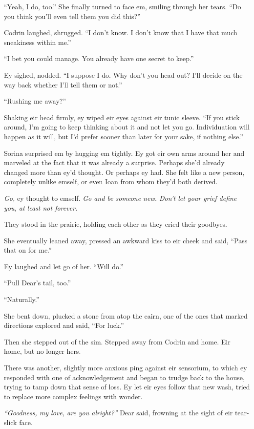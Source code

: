 ``Yeah, I do, too.'' She finally turned to face em, smiling through her tears. ``Do you think you'll even tell them you did this?''

Codrin laughed, shrugged. ``I don't know. I don't know that I have that much sneakiness within me.''

``I bet you could manage. You already have one secret to keep.''

Ey sighed, nodded. ``I suppose I do. Why don't you head out? I'll decide on the way back whether I'll tell them or not.''

``Rushing me away?''

Shaking eir head firmly, ey wiped eir eyes against eir tunic sleeve. ``If you stick around, I'm going to keep thinking about it and not let you go. Individuation will happen as it will, but I'd prefer sooner than later for your sake, if nothing else.''

Sorina surprised em by hugging em tightly. Ey got eir own arms around her and marveled at the fact that it was already a surprise. Perhaps she'd already changed more than ey'd thought. Or perhaps ey had. She felt like a new person, completely unlike emself, or even Ioan from whom they'd both derived.

\emph{Go,} ey thought to emself. \emph{Go and be someone new. Don't let your grief define you, at least not forever.}

They stood in the prairie, holding each other as they cried their goodbyes.

She eventually leaned away, pressed an awkward kiss to eir cheek and said, ``Pass that on for me.''

Ey laughed and let go of her. ``Will do.''

``Pull Dear's tail, too.''

``Naturally.''

She bent down, plucked a stone from atop the cairn, one of the ones that marked directions explored and said, ``For luck.''

Then she stepped out of the sim. Stepped away from Codrin and home. Eir home, but no longer hers.

There was another, slightly more anxious ping against eir sensorium, to which ey responded with one of acknowledgement and began to trudge back to the house, trying to tamp down that sense of loss. Ey let eir eyes follow that new wash, tried to replace more complex feelings with wonder.

\emph{``Goodness, my love, are you alright?''} Dear said, frowning at the sight of eir tear-slick face.

